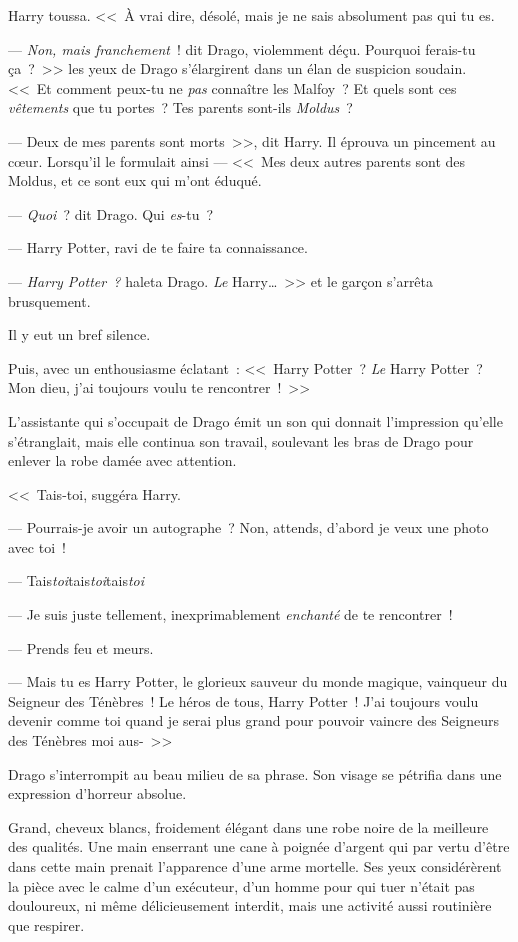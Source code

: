 Harry toussa.
<<~À vrai dire, désolé, mais je ne sais absolument pas qui tu es.

--- \emph{Non, mais franchement}~! dit Drago, violemment déçu. Pourquoi ferais-tu ça~?~>> les yeux de Drago s'élargirent dans un élan de suspicion soudain. <<~Et comment peux-tu ne \emph{pas} connaître les Malfoy~? Et quels sont ces \emph{vêtements} que tu portes~? Tes parents sont-ils \emph{Moldus}~?

--- Deux de mes parents sont morts~>>, dit Harry. Il éprouva un pincement au cœur. Lorsqu'il le formulait ainsi — <<~Mes deux autres parents sont des Moldus, et ce sont eux qui m'ont éduqué.

--- \emph{Quoi}~? dit Drago. Qui \emph{es}-tu~?

--- Harry Potter, ravi de te faire ta connaissance.

--- \emph{Harry Potter~?} haleta Drago. \emph{Le} Harry…~>> et le garçon s'arrêta brusquement.

Il y eut un bref silence.

Puis, avec un enthousiasme éclatant~: <<~Harry Potter~? \emph{Le} Harry Potter~? Mon dieu, j'ai toujours voulu te rencontrer~!~>>

L'assistante qui s'occupait de Drago émit un son qui donnait l'impression qu'elle s'étranglait, mais elle continua son travail, soulevant les bras de Drago pour enlever la robe damée avec attention.

<<~Tais-toi, suggéra Harry.

--- Pourrais-je avoir un autographe~? Non, attends, d'abord je veux une photo avec toi~!

--- Tais\emph{toi}tais\emph{toi}tais\emph{toi}

--- Je suis juste tellement, inexprimablement \emph{enchanté} de te rencontrer~!

--- Prends feu et meurs.

--- Mais tu es Harry Potter, le glorieux sauveur du monde magique, vainqueur du Seigneur des Ténèbres~! Le héros de tous, Harry Potter~! J'ai toujours voulu devenir comme toi quand je serai plus grand pour pouvoir vaincre des Seigneurs des Ténèbres moi aus-~>>

Drago s'interrompit au beau milieu de sa phrase. Son visage se pétrifia dans une expression d'horreur absolue.

Grand, cheveux blancs, froidement élégant dans une robe noire de la meilleure des qualités. Une main enserrant une cane à poignée d'argent qui par vertu d'être dans cette main prenait l'apparence d'une arme mortelle. Ses yeux considérèrent la pièce avec le calme d'un exécuteur, d'un homme pour qui tuer n'était pas douloureux, ni même délicieusement interdit, mais une activité aussi routinière que respirer.

